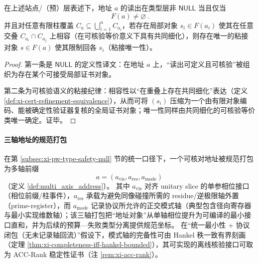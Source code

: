 \begin{proposition}\label{prop:cdim-nonnull-section-criterion}
在上述站点/（预）层表述下，地址 \(a\) 的读出在类型层非 \(\mathsf{NULL}\) 当且仅当
\[
\boxed{\ F(a)\neq\varnothing\ }.
\]
并且对任意有限柱覆盖 \(C_a\subseteq \bigcup_{i=1}^{n}C_{a_i}\)，若存在局部对象 \(s_i\in F(a_i)\) 使其在任意交叠 \(C_{a_i}\cap C_{a_j}\) 上相容（在可核验等价意义下具有共同细化），则存在唯一的粘接对象 \(s\in F(a)\) 使其限制回各 \(s_i\)（粘接唯一性）。
\end{proposition}
\begin{proof}
第一条是 \(\mathsf{NULL}\) 的定义性译文：在地址 \(a\) 上，“读出可定义且可核验”被组织为存在某个可接受局部证书对象。
\par
第二条为可核验语义的粘接纪律：相容性以“在重叠上存在共同细化”表达（定义 \ref{def:xi-cert-refinement-equivalence}），从而可将 \((s_i)\) 压缩为一个由有限对象编码、能被确定性验证器复核的全局证书对象；唯一性同样由共同细化的可核验等价类唯一确定。证毕。
\end{proof}

\paragraph{三轴地址的规范打包}
在第 \ref{subsec:xi-pw-type-safety-null} 节的统一口径下，一个可核对地址被规范打包为多轴前缀
\[
a=(a_{\mathrm{vis}},a_{\mathrm{res}},a_{\mathrm{mode}})
\]
（定义 \ref{def:multi_axis_address}）。
其中 \(a_{\mathrm{vis}}\) 对齐 unitary slice 的单参相位接口（相位前缀/柱事件），\(a_{\mathrm{res}}\) 承载为避免同像碰撞所需的 residue/逆极限轴外置（prime-register），而 \(a_{\mathrm{mode}}\) 记录协议所允许的正交模式轴（典型包含径向寄存器与最小实现维数轴）；该三轴打包把“地址对象”从单轴相位提升为可编译的最小接口直和，并为后续的预算—失败类型分离提供规范坐标。
在“统一最小性 + 协议闭包（无未记录轴回流）”假设下，模式轴的完备性可由 Hankel 秩一致有界刻画（定理 \ref{thm:xi-completeness-iff-hankel-bounded}），其可实现的离线核验接口可取为 ACC-Rank 稳定性证书（注 \ref{rem:xi-acc-rank}）。

